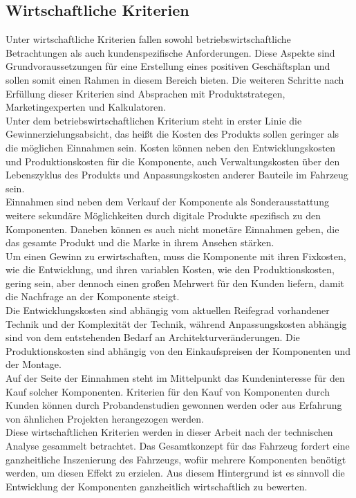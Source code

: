 \subsection{Wirtschaftliche Kriterien}
Unter wirtschaftliche Kriterien fallen sowohl betriebswirtschaftliche Betrachtungen als auch kundenspezifische Anforderungen. Diese Aspekte sind Grundvoraussetzungen für eine Erstellung eines positiven Geschäftsplan und sollen somit einen Rahmen in diesem Bereich bieten. Die weiteren Schritte nach Erfüllung dieser Kriterien sind Absprachen mit Produktstrategen, Marketingexperten und Kalkulatoren. \\
Unter dem betriebswirtschaftlichen Kriterium steht in erster Linie die Gewinnerzielungsabsicht, das heißt die Kosten des Produkts sollen geringer als die möglichen Einnahmen sein. Kosten können neben den Entwicklungskosten und Produktionskosten für die Komponente, auch Verwaltungskosten über den Lebenszyklus des Produkts und Anpassungskosten anderer Bauteile im Fahrzeug sein. \\
Einnahmen sind neben dem Verkauf der Komponente als Sonderausstattung weitere sekundäre Möglichkeiten durch digitale Produkte spezifisch zu den Komponenten. Daneben können es auch nicht monetäre Einnahmen geben, die das gesamte Produkt und die Marke in ihrem Ansehen stärken.\\
Um einen Gewinn zu erwirtschaften, muss die Komponente mit ihren Fixkosten, wie die Entwicklung, und ihren variablen Kosten, wie den Produktionskosten, gering sein, aber dennoch einen großen Mehrwert für den Kunden liefern, damit die Nachfrage an der Komponente steigt. \\
Die Entwicklungskosten sind abhängig vom aktuellen Reifegrad vorhandener Technik und der Komplexität der Technik, während Anpassungskosten abhängig sind von dem entstehenden Bedarf an Architekturveränderungen. Die Produktionskosten sind abhängig von den Einkaufspreisen der Komponenten und der Montage. \\
Auf der Seite der Einnahmen steht im Mittelpunkt das Kundeninteresse für den Kauf solcher Komponenten. Kriterien für den Kauf von Komponenten durch Kunden können durch Probandenstudien gewonnen werden oder aus Erfahrung von ähnlichen Projekten herangezogen werden. \\
Diese wirtschaftlichen Kriterien werden in dieser Arbeit nach der technischen Analyse gesammelt betrachtet. Das Gesamtkonzept für das Fahrzeug fordert eine ganzheitliche Inszenierung des Fahrzeugs, wofür mehrere Komponenten benötigt werden, um diesen Effekt zu erzielen. Aus diesem Hintergrund ist es sinnvoll die Entwicklung der Komponenten ganzheitlich wirtschaftlich zu bewerten. \\
